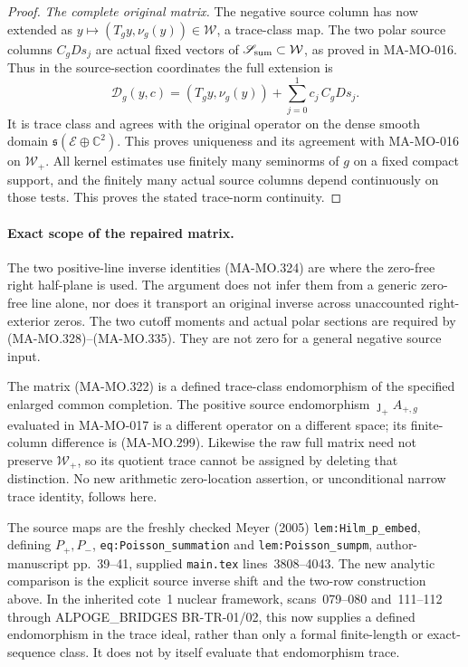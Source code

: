 \begin{proof}
\emph{The complete original matrix.}
The negative source column has now extended as
\(y\mapsto(T_gy,\nu_g(y))\in\mathcal W\), a trace-class
map. The two polar source columns
\(C_gDs_j\) are actual fixed vectors of
\(\mathscr S_{\rm sum}\subset\mathcal W\), as proved in
MA-MO-016. Thus in the source-section coordinates the full
extension is
\[
       \mathscr D_g(y,c)=
             (T_gy,\nu_g(y))
                       +\sum_{j=0}^1c_j\,C_gDs_j.
 \tag{MA-MO.337}
\]
It is trace class and agrees with the original operator on
the dense smooth domain
\(\mathfrak s(\mathcal E\oplus\mathbb C^2)\).
This proves uniqueness and its agreement with MA-MO-016
on \(\mathcal W_+\). All kernel estimates use finitely
many seminorms of \(g\) on a fixed compact support, and
the finitely many actual source columns depend continuously
on those tests. This proves the stated trace-norm continuity.
\end{proof}

\paragraph{Exact scope of the repaired matrix.}
The two positive-line inverse identities (MA-MO.324) are
where the zero-free right half-plane is used. The argument
does not infer them from a generic zero-free line alone, nor
does it transport an original inverse across unaccounted
right-exterior zeros. The two cutoff moments and actual
polar sections are required by (MA-MO.328)--(MA-MO.335).
They are not zero for a general negative source input.

The matrix (MA-MO.322) is a defined trace-class endomorphism
of the specified enlarged common completion. The positive
source endomorphism \(\jmath_+A_{+,g}\) evaluated in
MA-MO-017 is a different operator on a different space;
its finite-column difference is (MA-MO.299). Likewise
the raw full matrix need not preserve \(\mathcal W_+\),
so its quotient trace cannot be assigned by deleting that
distinction. No new arithmetic zero-location assertion,
or unconditional narrow trace identity, follows here.

The source maps are the freshly checked Meyer (2005)
\texttt{lem:Hilm\_p\_embed}, defining \(P_+,P_-\),
\texttt{eq:Poisson\_summation} and
\texttt{lem:Poisson\_sumpm}, author-manuscript pp.~39--41,
supplied \texttt{main.tex} lines~3808--4043.
The new analytic comparison is the explicit source inverse
shift and the two-row construction above. In the inherited
cote~1 nuclear framework, scans~079--080 and~111--112
through ALPOGE\_BRIDGES BR-TR-01/02, this now supplies a
defined endomorphism in the trace ideal, rather than only
a formal finite-length or exact-sequence class. It does not
by itself evaluate that endomorphism trace.
